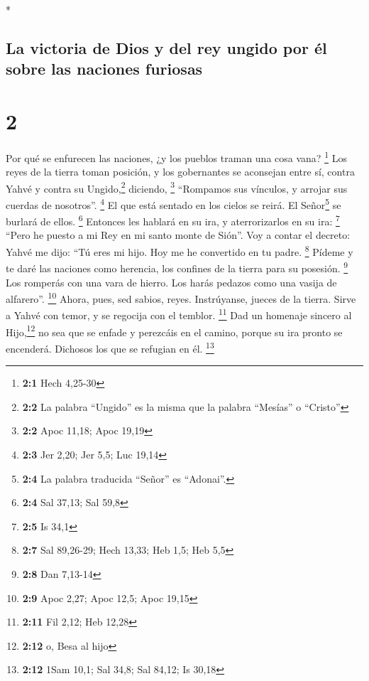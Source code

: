 \begin{paracol}{2}
\begin{otherlanguage}{english}
\end{otherlanguage}

\switchcolumn[0]*

\hypertarget{la-victoria-de-dios-y-del-rey-ungido-por-uxe9l-sobre-las-naciones-furiosas}{%
\subsection{La victoria de Dios y del rey ungido por él sobre las
naciones
furiosas}\label{la-victoria-de-dios-y-del-rey-ungido-por-uxe9l-sobre-las-naciones-furiosas}}

\hypertarget{section-2}{%
\section{2}\label{section-2}}

 Por qué se enfurecen las naciones, ¿y los pueblos traman
una cosa vana? \footnote{\textbf{2:1} Hech 4,25-30}  Los
reyes de la tierra toman posición, y los gobernantes se aconsejan entre
sí, contra Yahvé y contra su Ungido,\footnote{\textbf{2:2} La palabra
  ``Ungido'' es la misma que la palabra ``Mesías'' o ``Cristo''}
diciendo, \footnote{\textbf{2:2} Apoc 11,18; Apoc 19,19} 
``Rompamos sus vínculos, y arrojar sus cuerdas de nosotros''.
\footnote{\textbf{2:3} Jer 2,20; Jer 5,5; Luc 19,14}  El
que está sentado en los cielos se reirá. El Señor\footnote{\textbf{2:4}
  La palabra traducida ``Señor'' es ``Adonai''.} se burlará de ellos.
\footnote{\textbf{2:4} Sal 37,13; Sal 59,8}  Entonces les
hablará en su ira, y aterrorizarlos en su ira: \footnote{\textbf{2:5} Is
  34,1}  ``Pero he puesto a mi Rey en mi santo monte de
Sión''.  Voy a contar el decreto: Yahvé me dijo: ``Tú eres
mi hijo. Hoy me he convertido en tu padre. \footnote{\textbf{2:7} Sal
  89,26-29; Hech 13,33; Heb 1,5; Heb 5,5}  Pídeme y te
daré las naciones como herencia, los confines de la tierra para su
posesión. \footnote{\textbf{2:8} Dan 7,13-14}  Los
romperás con una vara de hierro. Los harás pedazos como una vasija de
alfarero''. \footnote{\textbf{2:9} Apoc 2,27; Apoc 12,5; Apoc 19,15}
 Ahora, pues, sed sabios, reyes. Instrúyanse, jueces de
la tierra.  Sirve a Yahvé con temor, y se regocija con el
temblor. \footnote{\textbf{2:11} Fil 2,12; Heb 12,28} 
Dad un homenaje sincero al Hijo,\footnote{\textbf{2:12} o, Besa al hijo}
no sea que se enfade y perezcáis en el camino, porque su ira pronto se
encenderá. Dichosos los que se refugian en él. \footnote{\textbf{2:12}
  1Sam 10,1; Sal 34,8; Sal 84,12; Is 30,18}


\end{paracol}
